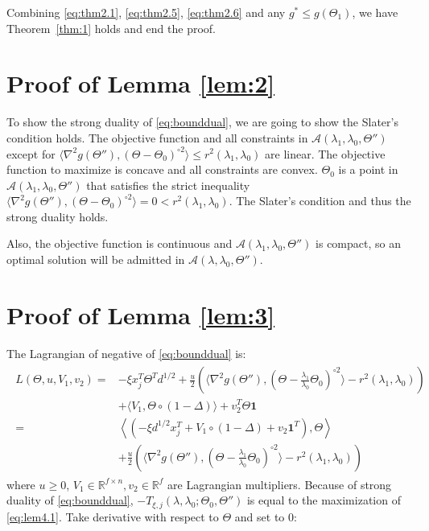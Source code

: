 Combining \eqref{eq:thm2.1}, \eqref{eq:thm2.5}, \eqref{eq:thm2.6} and any $g^*\leq g(\Theta_{1})$, we have Theorem~\ref{thm:1} holds and end the proof.

\hspace{0 in}

\section{Proof of Lemma \ref{lem:2}}
\label{sec:lem2proof}

To show the strong duality of \eqref{eq:bounddual}, we are going to show the Slater's condition holds. The objective function and all constraints in $\mathcal{A}(\lambda_1,{\lambda_0},\Theta'')$ except for $\langle\nabla^2 g(\Theta''),(\Theta-\Theta_{0})^{\circ 2}\rangle\leq r^2(\lambda_1,\lambda_0)$ are linear. The objective function to maximize is concave and all constraints are convex. $\Theta_{0}$ is a point in $\mathcal{A}(\lambda_1,{\lambda_0},\Theta'')$ that satisfies the strict inequality $\langle\nabla^2 g(\Theta''),(\Theta-\Theta_{0})^{\circ 2}\rangle=0< r^2(\lambda_1,\lambda_0)$. The Slater's condition and thus the strong duality holds.

Also, the objective function is continuous and $\mathcal{A}(\lambda_1,{\lambda_0},\Theta'')$ is compact, so an optimal solution will be admitted in $\mathcal{A}(\lambda,{\lambda_0},\Theta'')$.


\section{Proof of Lemma \ref{lem:3}}
\label{sec:lem3proof}

The Lagrangian of negative of \eqref{eq:bounddual} is:
\begin{gather}
    \label{eq:lem4.1}
    \begin{aligned}
        L(\Theta,u,V_1,v_2)=&-\xi x_j^T\Theta^T d^{1/2}+\frac{u}{2}\left(\langle\nabla^2 g(\Theta''),(\Theta-\frac{\lambda_1}{\lambda_0}\Theta_{0})^{\circ 2}\rangle-r^2(\lambda_1,\lambda_0)\right)\\
        &+\langle V_1,\Theta\circ(1-\Delta)\rangle+v_2^T\Theta\mathbf{1}\\
        =&\left\langle\left(-\xi d^{1/2}x_j^T+V_1\circ(1-\Delta)+v_2\mathbf{1}^T\right),\Theta\right\rangle\\
        &+\frac{u}{2}\left(\langle\nabla^2 g(\Theta''),(\Theta-\frac{\lambda_1}{\lambda_0}\Theta_{0})^{\circ 2}\rangle-r^2(\lambda_1,\lambda_0)\right)
    \end{aligned}
\end{gather}
where $u\geq 0$, $V_1\in\mathbb{R}^{f\times n},v_2\in\mathbb{R}^f$ are Lagrangian multipliers. Because of strong duality of \eqref{eq:bounddual}, $-T_{\xi,j}(\lambda,\lambda_0;\Theta_{0},\Theta'')$ is equal to the maximization of \eqref{eq:lem4.1}. Take derivative with respect to $\Theta$ and set to 0:

